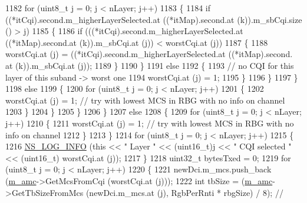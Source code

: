 \begin{DoxyCode}
1182                   \textcolor{keywordflow}{for} (uint8\_t j = 0; j < nLayer; j++)
1183                     \{
1184                       \textcolor{keywordflow}{if} ((*itCqi).second.m\_higherLayerSelected.at ((*itMap).second.at (k)).m\_sbCqi.size ()
       > j)
1185                         \{
1186                           \textcolor{keywordflow}{if} (((*itCqi).second.m\_higherLayerSelected.at ((*itMap).second.at (k)).m\_sbCqi.at
       (j)) < worstCqi.at (j))
1187                             \{
1188                               worstCqi.at (j) = ((*itCqi).second.m\_higherLayerSelected.at ((*itMap).second.
      at (k)).m\_sbCqi.at (j));
1189                             \}
1190                         \}
1191                       \textcolor{keywordflow}{else}
1192                         \{
1193                           \textcolor{comment}{// no CQI for this layer of this suband -> worst one}
1194                           worstCqi.at (j) = 1;
1195                         \}
1196                     \}
1197                 \}
1198               \textcolor{keywordflow}{else}
1199                 \{
1200                   \textcolor{keywordflow}{for} (uint8\_t j = 0; j < nLayer; j++)
1201                     \{
1202                       worstCqi.at (j) = 1; \textcolor{comment}{// try with lowest MCS in RBG with no info on channel}
1203                     \}
1204                 \}
1205             \}
1206         \}
1207       \textcolor{keywordflow}{else}
1208         \{
1209           \textcolor{keywordflow}{for} (uint8\_t j = 0; j < nLayer; j++)
1210             \{
1211               worstCqi.at (j) = 1; \textcolor{comment}{// try with lowest MCS in RBG with no info on channel}
1212             \}
1213         \}
1214       \textcolor{keywordflow}{for} (uint8\_t j = 0; j < nLayer; j++)
1215         \{
1216           \hyperlink{group__logging_gafbd73ee2cf9f26b319f49086d8e860fb}{NS\_LOG\_INFO} (\textcolor{keyword}{this} << \textcolor{stringliteral}{" Layer "} << (uint16\_t)j << \textcolor{stringliteral}{" CQI selected "} << (uint16\_t)
      worstCqi.at (j));
1217         \}
1218       uint32\_t bytesTxed = 0;
1219       \textcolor{keywordflow}{for} (uint8\_t j = 0; j < nLayer; j++)
1220         \{
1221           newDci.m\_mcs.push\_back (\hyperlink{classns3_1_1TtaFfMacScheduler_a9c8e60d48cae88a03fb5621285733186}{m\_amc}->GetMcsFromCqi (worstCqi.at (j)));
1222           \textcolor{keywordtype}{int} tbSize = (\hyperlink{classns3_1_1TtaFfMacScheduler_a9c8e60d48cae88a03fb5621285733186}{m\_amc}->GetTbSizeFromMcs (newDci.m\_mcs.at (j), RgbPerRnti * rbgSize) / 8); \textcolor{comment}{//
}
\end{DoxyCode}
